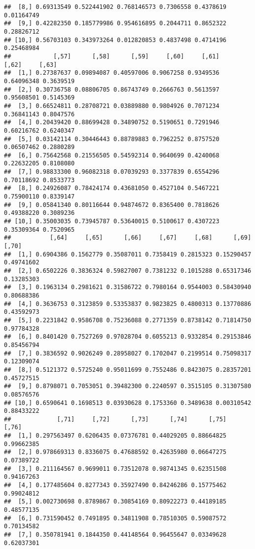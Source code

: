 \documentclass[
]{article}
\begin{document}
\begin{verbatim}
##  [8,] 0.69313549 0.522441902 0.768146573 0.7306558 0.4378619 0.01164749
##  [9,] 0.42282350 0.185779986 0.954616895 0.2044711 0.8652322 0.28826712
## [10,] 0.56703103 0.343973264 0.012820853 0.4837498 0.4714196 0.25468984
##            [,57]      [,58]      [,59]     [,60]     [,61]      [,62]     [,63]
##  [1,] 0.27387637 0.09894087 0.40597006 0.9067258 0.9349536 0.64096348 0.3639519
##  [2,] 0.30736758 0.08806705 0.86743749 0.2666763 0.5613597 0.95608501 0.5145369
##  [3,] 0.66524811 0.28708721 0.03889880 0.9804926 0.7071234 0.36841143 0.8047576
##  [4,] 0.20439420 0.88699428 0.34890752 0.5190651 0.7291946 0.60216762 0.6240347
##  [5,] 0.03142114 0.30446443 0.88789883 0.7962252 0.8757520 0.06507462 0.2880289
##  [6,] 0.75642568 0.21556505 0.54592314 0.9640699 0.4240068 0.22632205 0.8108080
##  [7,] 0.98833300 0.96082318 0.07039293 0.3377839 0.6554296 0.70118692 0.8533773
##  [8,] 0.24926087 0.78424174 0.43681050 0.4527104 0.5467221 0.75900110 0.8339147
##  [9,] 0.05841340 0.80116644 0.94874672 0.8365400 0.7818626 0.49388220 0.3089236
## [10,] 0.35003035 0.73945787 0.53640015 0.5100617 0.4307223 0.35309364 0.7520965
##           [,64]     [,65]      [,66]     [,67]     [,68]      [,69]      [,70]
##  [1,] 0.6904386 0.1562779 0.35087011 0.7358419 0.2815323 0.15290457 0.49741602
##  [2,] 0.6502226 0.3836324 0.59827007 0.7381232 0.1015288 0.65317346 0.13285303
##  [3,] 0.1963134 0.2981621 0.31586722 0.7980164 0.9544003 0.58430940 0.80688386
##  [4,] 0.3636753 0.3123859 0.53353837 0.9823825 0.4800313 0.13770886 0.43592973
##  [5,] 0.2231842 0.9586708 0.75236088 0.2771359 0.8738142 0.71814750 0.97784328
##  [6,] 0.8401420 0.7527269 0.97028704 0.6055213 0.9332854 0.29153846 0.85456794
##  [7,] 0.3836592 0.9026249 0.28958027 0.1702047 0.2199514 0.75098317 0.12309074
##  [8,] 0.5121372 0.5725240 0.95011699 0.7552486 0.8423075 0.28357201 0.45727515
##  [9,] 0.8798071 0.7053051 0.39482300 0.2240597 0.3515105 0.31307580 0.08576576
## [10,] 0.6590641 0.1698513 0.03930628 0.1753360 0.3489638 0.00310542 0.88433222
##             [,71]     [,72]      [,73]      [,74]      [,75]      [,76]
##  [1,] 0.297563497 0.6206435 0.07376781 0.44029205 0.88664825 0.99662385
##  [2,] 0.978669313 0.8336075 0.47688592 0.42635980 0.06647275 0.07389722
##  [3,] 0.211164567 0.9699011 0.73512078 0.98741345 0.62351508 0.94167263
##  [4,] 0.177485604 0.8277343 0.35927490 0.84246286 0.15775462 0.99024812
##  [5,] 0.002730698 0.8789867 0.30854169 0.80922273 0.44189185 0.48577135
##  [6,] 0.731590452 0.7491895 0.34811908 0.78510305 0.59087572 0.70134582
##  [7,] 0.350781941 0.1844350 0.44148564 0.96455647 0.03349628 0.62037301

\end{verbatim}
\end{document}
